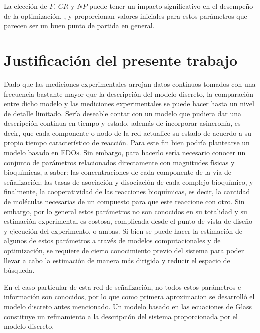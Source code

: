 La elección de $F$, $CR$ y $NP$ puede tener un impacto significativo en el desempeño de la optimización. \citeauthor{Storn1997}  \citep{Storn1997}, y \citeauthor{lampinen2002} \citep{lampinen2002} proporcionan valores iniciales para estos parámetros que parecen ser un buen punto de partida en general.

\section{Justificación del presente trabajo}

Dado que las mediciones experimentales arrojan datos continuos tomados con una frecuencia bastante mayor que la descripción del modelo discreto, la comparación entre dicho modelo y las mediciones experimentales se puede hacer hasta un nivel de detalle limitado. Sería deseable contar con un modelo que pudiera dar una descripción continua en tiempo y estado, además de incorporar asincronía, es decir, que cada componente o nodo de la red actualice su estado de acuerdo a su propio tiempo característico de reacción. Para este fin bien podría plantearse un modelo basado en \textsc{EDOs}. Sin embargo, para hacerlo sería necesario conocer un conjunto de parámetros relacionados directamente con magnitudes físicas y bioquímicas, a saber: las concentraciones de cada componente de la vía de señalización; las tasas de asociación y disociación de cada complejo bioquímico, y finalmente, la cooperatividad de las reacciones bioquímicas, es decir, la cantidad de moléculas necesarias de un compuesto para que este reaccione con otro. Sin embargo, por lo general estos parámetros no son conocidos en su totalidad y su estimación experimental es costosa, complicada desde el punto de vista de diseño y ejecución del experimento, o ambas. Si bien se puede hacer la estimación de algunos de estos parámetros a través de modelos computacionales y de optimización, se requiere de cierto conocimiento previo del sistema para poder llevar a cabo la estimación de manera más dirigida y reducir el espacio de búsqueda.

En el caso particular de esta red de señalización, no todos estos parámetros e información son conocidos, por lo que como primera aproximacion se desarrolló el modelo discreto antes mencionado. Un modelo basado en las ecuaciones de Glass constituye un refinamiento a la descripción del sistema proporcionada por el modelo discreto.

